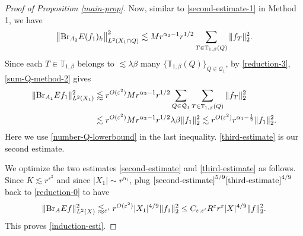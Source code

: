 \documentclass{amsart}
\numberwithin{equation}{section}
\newcommand{\al}{\alpha}
\newcommand{\be}{\beta}
\newcommand{\e}{\varepsilon}
\newcommand{\la}{\lambda}
\newcommand{\cq}{\mathcal Q}
\newcommand{\ZT}{\mathbb{T}}
\newcommand{\BR}{{\rm{Br}}}
\begin{document}
\begin{proof}[Proof of Proposition \ref{main-prop}]
\smallskip

Now, similar to \eqref{second-estimate-1} in Method 1, we have
\begin{equation}
\label{sum-Q-method-2}
    \big\|\BR_{A_2}E(f_1)_k\big\|_{L^2(X_1\cap Q)}^2\lesssim Mr^{\al_2-1}r^{1/2}\sum_{T\in\ZT_{1,\be}(Q)}\|f_T\|_2^2.
\end{equation}
Since each $T\in\ZT_{1,\be}$  belongs to $\lesssim \la\be$ many $\{\ZT_{1,\be}(Q)\}_{Q\in\cq_1}$,  by \eqref{reduction-3}, \eqref{sum-Q-method-2} gives
\begin{align}
    \|\BR_{A_1} Ef_1\|_{L^2(X_1)}^2&\lessapprox r^{O(\e^2)} Mr^{\al_2-1}r^{1/2}\sum_{Q\in\cq_1}\sum_{T\in\ZT_{1,\be}(Q)}\|f_T\|_2^2\\ \label{third-estimate}
    &\lesssim r^{O(\e^2)} Mr^{\al_2-1}r^{1/2}\la\be\|f_1\|_2^2\lesssim r^{O(\e^2)} r^{\al_1-\frac{1}{2}}\|f_1\|_2^2.
\end{align}
Here we use \eqref{number-Q-lowerbound} in the last inequality. 
\eqref{third-estimate} is our second estimate.

\bigskip

We optimize the two estimates \eqref{second-estimate} and \eqref{third-estimate} as follows.
Since $K\lesssim r^{\e^2}$ and since $|X_1|\sim r^{\al_1}$, plug $\eqref{second-estimate}^{5/9}\eqref{third-estimate}^{4/9}$ back to \eqref{reduction-0} to have
\begin{equation}
    \|\BR_A Ef\|_{L^2(X)}^2\lessapprox_{\e'} r^{O(\e^2)}|X_1|^{4/9}\|f_1\|_2^2\leq  C_{\e,\e'} R^{\e}r^\e|X|^{4/9}\|f\|_2^2.
\end{equation}
This proves \eqref{induction-esti}. \qedhere


\end{proof}

\medskip 
\end{document}
